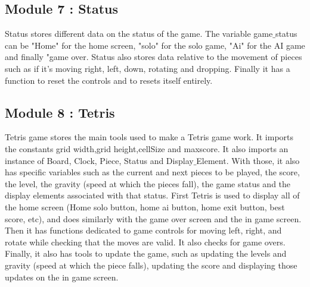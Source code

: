 \documentclass[conference]{IEEEtran}
\begin{document}
\subsection{Module 7 : Status}
Status stores different data on the status of the game. The variable game$\_$status can be "Home" for the home screen, "solo" for the solo game, "Ai" for the AI game and finally "game over. Status also stores data relative to the movement of pieces such as if it's moving right, left, down, rotating and dropping. Finally it has a function to reset the controls and to resets itself entirely.

\subsection{Module 8 : Tetris}
Tetris game stores the main tools used to make a Tetris game work. It imports the constants grid width,grid height,cellSize and maxscore. It also imports an instance of Board, Clock, Piece, Status and Display$\_$Element. With those, it also has specific variables such as the current and next pieces to be played, the score, the level, the gravity (speed at which the pieces fall), the game status and the display elements associated with that status. First Tetris is used to display all of the home screen (Home solo button, home ai button, home exit button, best score, etc), and does similarly with the game over screen and the in game screen. Then it has functions dedicated to game controls for moving left, right, and rotate while checking that the moves are valid. It also checks for game overs. Finally, it also has tools to update the game, such as updating the levels and gravity (speed at which the piece falls), updating the score and displaying those updates on the in game screen.
\end{document}

